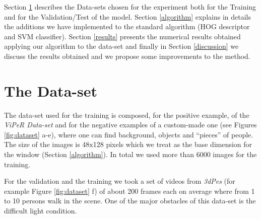 \documentclass[a4paper,letterpaper, 11pt, onecolumn]{article} %
\begin{document}
Section \ref{dataset} describes the Data-sets chosen for the experiment both for the Training and for the Validation/Test of the model. Section \ref{algorithm} explains in details the additions we have implemented to the standard algorithm (HOG descriptor and SVM classifier). Section \ref{results} presents the numerical results obtained applying our algorithm to the data-set and finally in Section \ref{discussion} we discuss the results obtained and we propose some improvements to the method.


\section{The Data-set}\label{dataset}
The data-set used for the training is composed, for the positive example, of the \emph{ViPeR Data-set} and for the negative examples of a custom-made one (see Figures \ref{fig:dataset} a-e), where one can find background, objects and ``pieces'' of people. 
The size of the images is 48x128 pixels which we treat as the base dimension for the window (Section \ref{algorithm}). In total we used more than 6000 images for the training.

For the validation and the training we took a set of videos from \emph{3dPes} (for example Figure \ref{fig:dataset} f) of about 200 frames each on average where from 1 to 10 persons walk in the scene. One of the major obstacles of this data-set is the difficult light condition.
\end{document}
